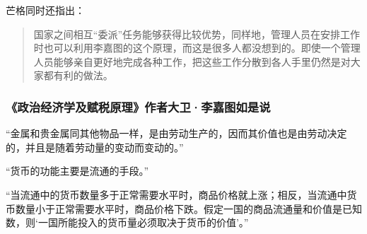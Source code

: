 芒格同时还指出：
\par

\begin{quotation}
国家之间相互“委派”任务能够获得比较优势，同样地，管理人员在安排工作时也可以利用李嘉图的这个原理，而这是很多人都没想到的。即使一个管理人员能够亲自更好地完成各种工作，把这些工作分散到各人手里仍然是对大家都有利的做法。
\par
\end{quotation}

\subsubsection*{《政治经济学及赋税原理》作者大卫·李嘉图如是说}

“金属和贵金属同其他物品一样，是由劳动生产的，因而其价值也是由劳动决定的，并且是随着劳动量的变动而变动的。”
\par

“货币的功能主要是流通的手段。”
\par

“当流通中的货币数量多于正常需要水平时，商品价格就上涨；相反，当流通中货币数量小于正常需要水平时，商品价格下跌。假定一国的商品流通量和价值是已知数，则‘一国所能投入的货币量必须取决于货币的价值’。”
\par
